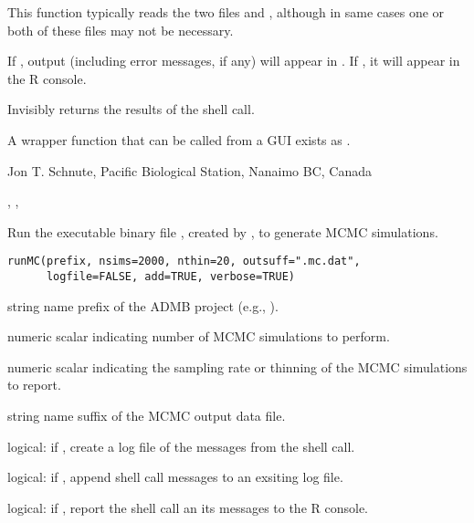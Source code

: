 \documentclass[letterpaper]{book}
\begin{document}
%
\begin{Details}\relax
This function typically reads the two files  and ,
although in same cases one or both of these files may not be necessary.

If , output (including error messages, if any) will appear in
. If , it will appear in the R console.
\end{Details}
%
\begin{Value}
Invisibly returns the results of the shell call.
\end{Value}
%
\begin{Note}\relax
A wrapper function that can be called from a GUI exists as .
\end{Note}
%
\begin{Author}\relax
 Jon T. Schnute, Pacific Biological Station, Nanaimo BC, Canada 
\end{Author}
%
\begin{SeeAlso}\relax
{}, , 
\end{SeeAlso}
%
\begin{Description}\relax
Run the executable binary file , created by 
, to generate MCMC simulations.
\end{Description}
%
\begin{Usage}
\begin{verbatim}
runMC(prefix, nsims=2000, nthin=20, outsuff=".mc.dat",
      logfile=FALSE, add=TRUE, verbose=TRUE)
\end{verbatim}
\end{Usage}
%
\begin{Arguments}
\begin{ldescription}
\item[\code{prefix}] string name prefix of the ADMB project (e.g., ).
\item[\code{nsims}] numeric scalar indicating number of MCMC simulations to perform.
\item[\code{nthin}] numeric scalar indicating the sampling rate or thinning of the 
 MCMC simulations to report.
\item[\code{outsuff}] string name suffix of the MCMC output data file.
\item[\code{logfile}] logical: if , create a log file of the messages from the shell call.
\item[\code{add}] logical: if , append shell call messages to an exsiting log file.
\item[\code{verbose}] logical: if , report the shell call an its messages to the R console.
\end{ldescription}
\end{Arguments}
\end{document}
